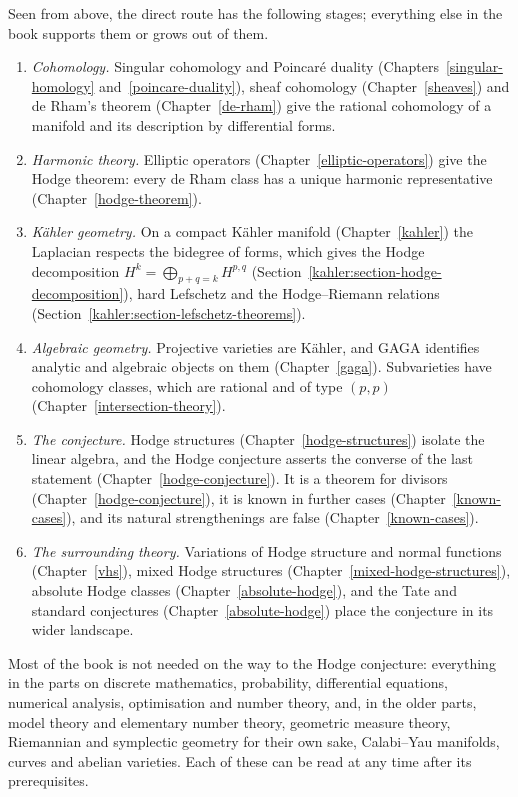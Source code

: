 Seen from above, the direct route has the following stages; everything else in the book supports them or grows out of them.
\begin{enumerate}
\item \emph{Cohomology.} Singular cohomology and Poincar\'e duality
(Chapters~\ref{singular-homology} and~\ref{poincare-duality}), sheaf
cohomology (Chapter~\ref{sheaves}) and de Rham's theorem
(Chapter~\ref{de-rham}) give the rational cohomology of a manifold and its
description by differential forms.
\item \emph{Harmonic theory.} Elliptic operators
(Chapter~\ref{elliptic-operators}) give the Hodge theorem: every de Rham class
has a unique harmonic representative (Chapter~\ref{hodge-theorem}).
\item \emph{K\"ahler geometry.} On a compact K\"ahler manifold
(Chapter~\ref{kahler}) the Laplacian respects the bidegree of forms, which gives
the Hodge decomposition $H^k = \bigoplus_{p+q=k}H^{p,q}$
(Section~\ref{kahler:section-hodge-decomposition}), hard Lefschetz and the Hodge--Riemann
relations (Section~\ref{kahler:section-lefschetz-theorems}).
\item \emph{Algebraic geometry.} Projective varieties are K\"ahler, and GAGA
identifies analytic and algebraic objects on them (Chapter~\ref{gaga}).
Subvarieties have cohomology classes, which are rational and of type $(p,p)$
(Chapter~\ref{intersection-theory}).
\item \emph{The conjecture.} Hodge structures (Chapter~\ref{hodge-structures})
isolate the linear algebra, and the Hodge conjecture asserts the converse of
the last statement (Chapter~\ref{hodge-conjecture}). It is a theorem for
divisors (Chapter~\ref{hodge-conjecture}), it is known in further cases
(Chapter~\ref{known-cases}), and its natural strengthenings are false
(Chapter~\ref{known-cases}).
\item \emph{The surrounding theory.} Variations of Hodge structure and normal
functions (Chapter~\ref{vhs}), mixed Hodge
structures (Chapter~\ref{mixed-hodge-structures}), absolute Hodge classes
(Chapter~\ref{absolute-hodge}), and the Tate and standard conjectures
(Chapter~\ref{absolute-hodge}) place the
conjecture in its wider landscape.
\end{enumerate}

\begin{remark}\label{introduction:remark-first-reading}
Most of the book is not needed on the way to the Hodge conjecture: everything in the parts on discrete mathematics, probability, differential equations, numerical analysis,
optimisation and number theory, and, in the older parts, model theory and elementary number theory, geometric measure theory, Riemannian and symplectic geometry for their own
sake, Calabi--Yau manifolds, curves and abelian varieties. Each of these can be read at any time after its prerequisites.
\end{remark}

